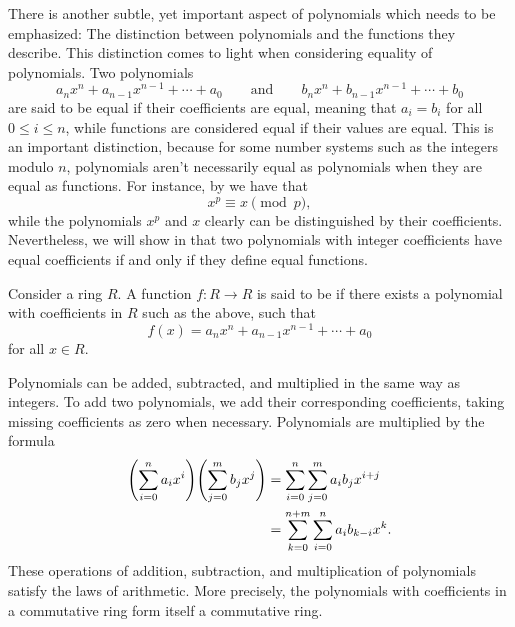 \begin{remark}
  There is another subtle, yet important aspect of polynomials which needs to be emphasized: The distinction between polynomials and the functions they describe. This distinction comes to light when considering equality of polynomials. Two polynomials
  \begin{equation*}
    a_nx^n+ a_{n-1}x^{n-1} +\cdots + a_0\qquad\text{and}\qquad b_nx^n+ b_{n-1}x^{n-1} +\cdots + b_0
  \end{equation*}
  are said to be equal if their coefficients are equal, meaning that $a_i=b_i$ for all $0\leq i\leq n$, while functions are considered equal if their values are equal. This is an important distinction, because for some number systems such as the integers modulo $n$, polynomials aren't necessarily equal as polynomials when they are equal as functions. For instance, by  we have that
  \begin{equation*}
    x^p \equiv x\pmod{p},
  \end{equation*}
  while the polynomials $x^p$ and $x$ clearly can be distinguished by their coefficients. Nevertheless, we will show in  that two polynomials with integer coefficients have equal coefficients if and only if they define equal functions.
\end{remark}

\begin{definition}
  Consider a ring $R$. A function $f:R\to R$ is said to be  if there exists a polynomial with coefficients in $R$ such as the above, such that
  \begin{equation*}
    f(x)=a_nx^n+ a_{n-1}x^{n-1} +\cdots + a_0
  \end{equation*}
  for all $x\in R$.
\end{definition}

\begin{remark}
  Polynomials can be added, subtracted, and multiplied in the same way as integers. To add two polynomials, we add their corresponding coefficients, taking missing coefficients as zero when necessary. Polynomials are multiplied by the formula
  \begin{align*}
    \Biggl(\sum_{i=0}^n a_ix^i\Biggr)\Biggl(\sum_{j=0\vphantom{i=0}}^mb_jx^j\Biggr)
    & = \sum_{i=0}^n\sum_{j=0}^ma_ib_jx^{i+j} \\
    & = \sum_{k=0}^{n+m}\sum_{i=0}^n a_i b_{k-i}x^{k}.    
  \end{align*}
  These operations of addition, subtraction, and multiplication of polynomials satisfy the laws of arithmetic. More precisely, the polynomials with coefficients in a commutative ring form itself a commutative ring.
\end{remark}

